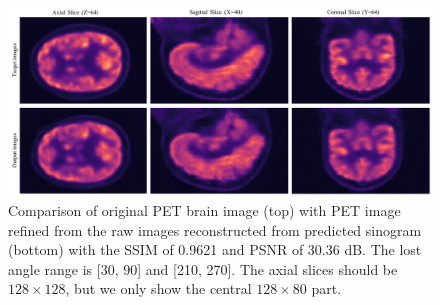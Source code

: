 \documentclass[12pt]{iopart}
\begin{document}
\begin{figure}[ht]
    \centering
    \includegraphics[width=\textwidth]{Images/target_outputs.pdf}
    \vspace{-1cm}
    \caption{Comparison of original PET brain image (top) with PET image refined from the raw images reconstructed from predicted sinogram (bottom) with the SSIM of 0.9621 and PSNR of 30.36 dB. The lost angle range is [30\degree, 90\degree] and [210\degree, 270\degree]. The axial slices should be $128\times128$, but we only show the central $128\times80$ part. 
    }
    \label{fig:compare_reconstruction_restoration}
\end{figure}

\end{document}
